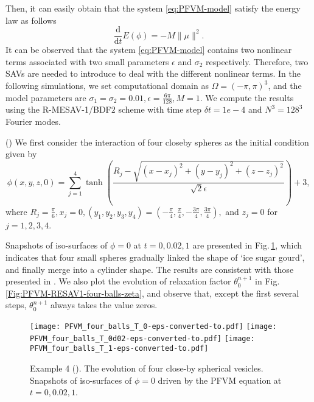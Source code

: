 \documentclass[final,review,onefignum,onetabnum]{siamart190516}
\theoremstyle{plain}
\begin{document}
Then, it can easily obtain that the system \eqref{eq:PFVM-model} satisfy the energy law as follows
\begin{equation}
	\frac{\mathrm{d}}{\mathrm{d} t} E(\phi)=-M\|\mu\|^{2}.
\end{equation}
It can be observed that the system \eqref{eq:PFVM-model} contains two nonlinear terms associated with two small parameters $\epsilon$ and $\sigma_2$ respectively. 
Therefore, two SAVs are needed to introduce to deal with the different nonlinear terms. 
In the following simulations, we set computational domain as $\Omega=(-\pi, \pi)^{3}$, and the model parameters are $\sigma_{1}=\sigma_{2}=0.01, \epsilon=\frac{6\pi}{128}, M=1$. 
We compute the results using  the  R-MESAV-1/BDF$2$ scheme with time step $\delta t=1e-4$ and $N^3=128^3$  Fourier modes.

()
We first consider the interaction of 
 four closeby spheres as the initial condition given by
\begin{equation}
\phi(x, y, z, 0)=\sum_{j=1}^{4} \tanh \left(\frac{R_{j}-\sqrt{\left(x-x_{j}\right)^{2}+\left(y-y_{j}\right)^{2}+\left(z-z_{j}\right)^{2}}}{\sqrt{2} \epsilon}\right)+3,
\end{equation}
where $R_{j}=\frac{\pi}{6}, x_{j}=0,\left(y_{1}, y_{2}, y_{3}, y_{4}\right)=\left(-\frac{\pi}{4},\frac{\pi}{4},-\frac{3 \pi}{4}, \frac{3 \pi}{4}\right),$ and $z_{j}=0$ for $j=1, 2, 3, 4$. 

Snapshots of iso-surfaces of $\phi=0$ at $t=0, 0.02, 1$ are presented in Fig.\,\ref{Fig:PFVM-RESAV1-four-balls}, which indicates that  four small spheres gradually linked the shape of `ice sugar gourd', and finally merge into a cylinder shape. 
The results are consistent with those presented in \cite{cheng2020global}. 
We also plot the evolution of relaxation factor $\theta_{0}^{n+1}$ in Fig.\,\ref{Fig:PFVM-RESAV1-four-balls-zeta}, and observe that, except the first several steps, $\theta_{0}^{n+1}$ always takes the value zeros. 

\begin{figure}[htbp]
\centering
	\texttt{[image: PFVM\_four\_balls\_T\_0-eps-converted-to.pdf]}\hspace{-9mm}
	\texttt{[image: PFVM\_four\_balls\_T\_0d02-eps-converted-to.pdf]}\hspace{-9mm}
	\texttt{[image: PFVM\_four\_balls\_T\_1-eps-converted-to.pdf]}
\caption{Example 4 (). The evolution of four close-by spherical vesicles. Snapshots of iso-surfaces of $\phi=0$ driven by the PFVM equation at $t=0, 0.02, 1$.}
\label{Fig:PFVM-RESAV1-four-balls}
\end{figure}
\end{document}
